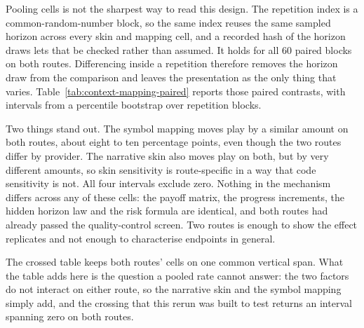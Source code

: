 \documentclass[sigconf,anonymous]{aamas}
\begin{document}
Pooling cells is not the sharpest way to read this design. The repetition index
is a common-random-number block, so the same index reuses the same sampled
horizon across every skin and mapping cell, and a recorded hash of the horizon
draws lets that be checked rather than assumed. It
holds for all 60 paired blocks on both routes. Differencing inside a
repetition therefore removes the horizon draw from the comparison and leaves
the presentation as the only thing that varies.
Table~\ref{tab:context-mapping-paired} reports those paired contrasts, with
intervals from a percentile bootstrap over repetition blocks.

Two things stand out. The symbol mapping moves play by a similar amount on both
routes, about eight to ten percentage points, even though the two routes differ
by provider. The narrative skin
also moves play on both, but by very different amounts, so skin sensitivity is
route-specific in a way that code sensitivity is not. All four intervals
exclude zero. Nothing in the mechanism differs across any of these cells: the
payoff matrix, the progress increments, the hidden horizon law and the risk
formula are identical, and both routes had already passed the quality-control
screen. Two routes is enough to show the effect replicates and not enough to
characterise endpoints in general.

The crossed table keeps both routes' cells on one common vertical span. What the
table adds here is the question a pooled rate cannot answer:
the two factors do not interact on either route, so the narrative skin and the
symbol mapping simply add, and the crossing that this rerun was built to test
returns an interval spanning zero on both routes.
\end{document}
